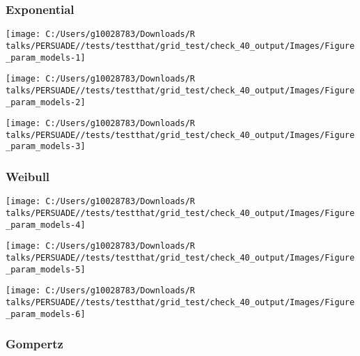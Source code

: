 \documentclass[
]{article}
\begin{document}
\clearpage

\clearpage

\subsubsection{Exponential}\label{exponential}

\begin{flushleft}\texttt{[image: C:/Users/g10028783/Downloads/R talks/PERSUADE//tests/testthat/grid\_test/check\_40\_output/Images/Figure\_param\_models-1]} \end{flushleft}

\begin{flushleft}\texttt{[image: C:/Users/g10028783/Downloads/R talks/PERSUADE//tests/testthat/grid\_test/check\_40\_output/Images/Figure\_param\_models-2]} \end{flushleft}

\begin{flushleft}\texttt{[image: C:/Users/g10028783/Downloads/R talks/PERSUADE//tests/testthat/grid\_test/check\_40\_output/Images/Figure\_param\_models-3]} \end{flushleft}

\clearpage

\subsubsection{Weibull}\label{weibull}

\begin{flushleft}\texttt{[image: C:/Users/g10028783/Downloads/R talks/PERSUADE//tests/testthat/grid\_test/check\_40\_output/Images/Figure\_param\_models-4]} \end{flushleft}

\begin{flushleft}\texttt{[image: C:/Users/g10028783/Downloads/R talks/PERSUADE//tests/testthat/grid\_test/check\_40\_output/Images/Figure\_param\_models-5]} \end{flushleft}

\begin{flushleft}\texttt{[image: C:/Users/g10028783/Downloads/R talks/PERSUADE//tests/testthat/grid\_test/check\_40\_output/Images/Figure\_param\_models-6]} \end{flushleft}

\clearpage

\subsubsection{Gompertz}\label{gompertz}
\end{document}
